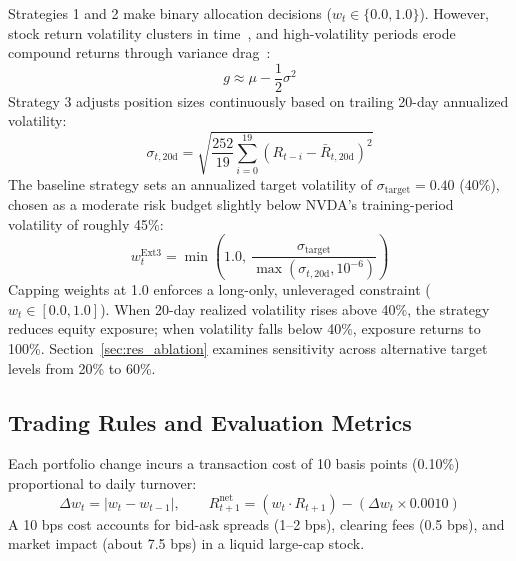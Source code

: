 \documentclass[11pt, a4paper]{article}
\begin{document}
Strategies 1 and 2 make binary allocation decisions ($w_t \in \{0.0, 1.0\}$). However, stock return volatility clusters in time~\cite{mandelbrot1963, engle1982}, and high-volatility periods erode compound returns through variance drag~\cite{moreira2017, harvey2018}:
\begin{equation}
g \approx \mu - \frac{1}{2}\sigma^2
\end{equation}
Strategy 3 adjusts position sizes continuously based on trailing 20-day annualized volatility:
\begin{equation}
\sigma_{t, 20\text{d}} = \sqrt{\frac{252}{19}\sum_{i=0}^{19}\left( R_{t-i} - \bar{R}_{t,20\text{d}} \right)^2}
\end{equation}
The baseline strategy sets an annualized target volatility of $\sigma_{\text{target}} = 0.40$ (40\%), chosen as a moderate risk budget slightly below NVDA's training-period volatility of roughly 45\%:
\begin{equation}
w_t^{\text{Ext3}} = \min\left(1.0, \ \frac{\sigma_{\text{target}}}{\max(\sigma_{t, 20\text{d}}, 10^{-6})}\right)
\end{equation}
Capping weights at 1.0 enforces a long-only, unleveraged constraint ($w_t \in [0.0, 1.0]$). When 20-day realized volatility rises above 40\%, the strategy reduces equity exposure; when volatility falls below 40\%, exposure returns to 100\%. Section~\ref{sec:res_ablation} examines sensitivity across alternative target levels from 20\% to 60\%.

\subsection{Trading Rules and Evaluation Metrics}
\label{sec:costs}

Each portfolio change incurs a transaction cost of 10 basis points (0.10\%) proportional to daily turnover:
\begin{equation}
\Delta w_t = |w_t - w_{t-1}|, \qquad R_{t+1}^{\text{net}} = \left( w_t \cdot R_{t+1} \right) - \left( \Delta w_t \times 0.0010 \right)
\end{equation}
A 10 bps cost accounts for bid-ask spreads (1--2 bps), clearing fees (0.5 bps), and market impact (about 7.5 bps) in a liquid large-cap stock.
\end{document}

